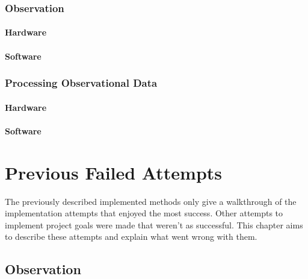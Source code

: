 			\subsection{Observation}
				\subsubsection{Hardware}
				\subsubsection{Software}
			\subsection{Processing Observational Data}
				\subsubsection{Hardware}
				\subsubsection{Software}
				
	\chapter{Previous Failed Attempts}
	The previously described implemented methods only give a walkthrough of the implementation attempts that enjoyed the most success. Other attempts to implement project goals were made that weren't as successful. This chapter aims to describe these attempts and explain what went wrong with them.
		\section{Observation}
	